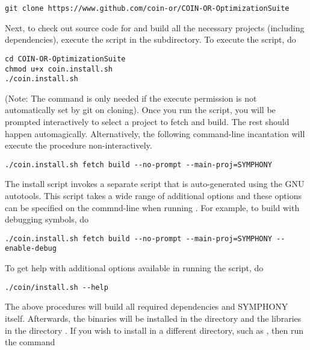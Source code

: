 {\color{Brown}
\begin{verbatim}
git clone https://www.github.com/coin-or/COIN-OR-OptimizationSuite
\end{verbatim}
}

Next, to check out source code for and build all the necessary projects
(including dependencies), execute the script in the 
subdirectory. To execute the script, do

{\color{Brown}
\begin{verbatim}
cd COIN-OR-OptimizationSuite
chmod u+x coin.install.sh
./coin.install.sh
\end{verbatim}
}

(Note: The  command is only needed if the execute permission is not
automatically set by git on cloning). Once you run the script,
you will be prompted interactively to select a project to fetch and build. The
rest should happen automagically. Alternatively, the following command-line
incantation will execute the procedure non-interactively.

{\color{Brown}
\begin{verbatim}
./coin.install.sh fetch build --no-prompt --main-proj=SYMPHONY
\end{verbatim}
}

The install script invokes a separate  script that is
auto-generated using the GNU autotools. This script takes a wide range of
additional options and these options can be specified on the commnd-line when
running . For example, to build with debugging symbols,
do

{\color{Brown}
\begin{verbatim}
./coin.install.sh fetch build --no-prompt --main-proj=SYMPHONY --enable-debug
\end{verbatim}
}

To get help with additional options available in running the script, do

{\color{Brown}
\begin{verbatim}
./coin/install.sh --help
\end{verbatim}
}

The above procedures will build all required dependencies and SYMPHONY itself.
Afterwards, the binaries will be installed in the directory 
and the libraries in the directory . If you wish to install in
a different directory, such as , then run the command

